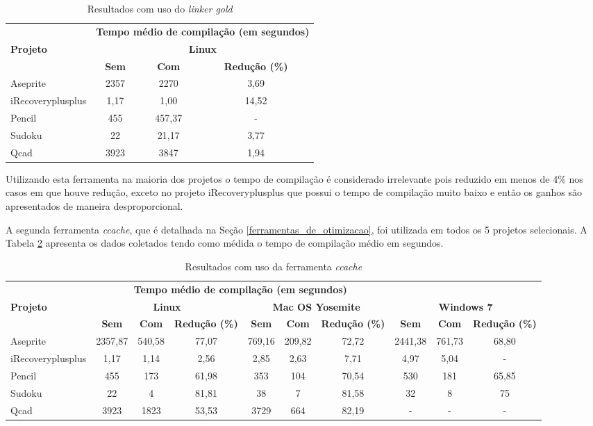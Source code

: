 \begin{table}[!ht]
\tiny
\centering
\caption{Resultados com uso do \textit{linker gold}}
\label{tab:gold}
\begin{tabular}{lccc}
& \multicolumn{3}{c}{\textbf{Tempo médio de compilação (em segundos)} } \\
\textbf{Projeto} & \multicolumn{3}{c}{\textbf{Linux}} \\ 
& \textbf{Sem } & \textbf{Com }  & \textbf{Redução (\%)} \\
\toprule
Aseprite            & 2357  & 2270      & 3,69 \\
iRecoveryplusplus   & 1,17  & 1,00      & 14,52 \\
Pencil              & 455   & 457,37    & - \\ 
Sudoku              & 22    & 21,17     & 3,77  \\
Qcad                & 3923  & 3847      & 1,94 \\
\end{tabular}
\end{table}

Utilizando esta ferramenta na maioria dos projetos o tempo de
 compilação é considerado irrelevante pois reduzido em menos de 4\% nos casos em que houve redução,
 exceto no projeto iRecoveryplusplus que possui o tempo de compilação
 muito baixo e então os ganhos são apresentados de maneira desproporcional.

A segunda ferramenta \textit{ccache}, que é detalhada na Seção \ref{ferramentas_de_otimizacao},
foi utilizada em todos os 5 projetos selecionais. A Tabela \ref{tab:ccache} apresenta os
 dados coletados tendo como médida o tempo de compilação médio em segundos.


\begin{table}[!ht]
\tiny
\centering
\caption{Resultados com uso da ferramenta \textit{ccache}}
\label{tab:ccache}
\begin{tabular}{lccccccccc}
& \multicolumn{6}{c}{\textbf{Tempo médio de compilação (em segundos)} } \\
\textbf{Projeto} & \multicolumn{3}{c}{\textbf{Linux}} & \multicolumn{3}{c}{\textbf{Mac OS Yosemite}} & \multicolumn{3}{c}{\textbf{Windows 7}} \\ 
& \textbf{Sem } & \textbf{Com }  & \textbf{Redução (\%)} & \textbf{Sem } & \textbf{Com }  & \textbf{Redução (\%)} & \textbf{Sem } & \textbf{Com }  & \textbf{Redução (\%)} \\
\toprule
Aseprite & 2357,87 & 540,58 & 77,07 & 769,16 & 209,82 & 72,72  & 2441,38 & 761,73  & 68,80 \\ 
iRecoveryplusplus & 1,17 & 1,14 & 2,56    & 2,85 & 2,63 & 7,71  & 4,97 & 5,04 & -  \\ 
Pencil & 455  & 173 & 61,98 & 353 & 104  & 70,54  & 530  & 181  & 65,85 \\ 
Sudoku & 22 & 4 & 81,81  & 38 & 7 & 81,58  & 32 & 8  &  75    \\ 
Qcad  & 3923 & 1823 & 53,53 & 3729 & 664 & 82,19 &  -  & -  & -  \\ 
\end{tabular}
\end{table}


